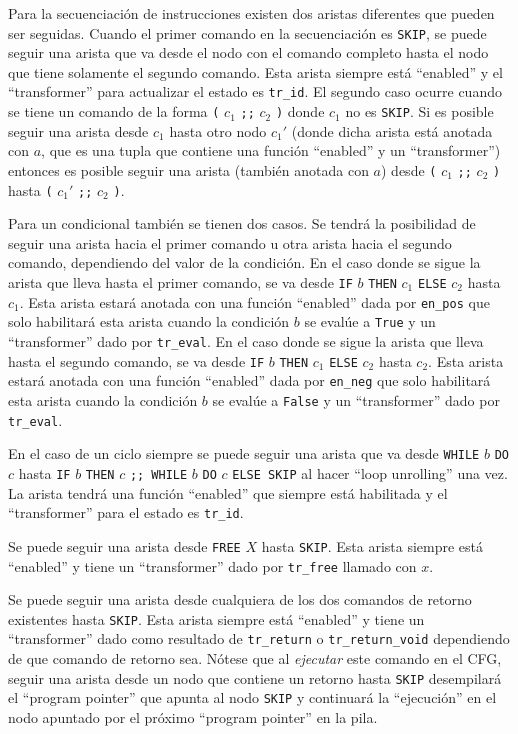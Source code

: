 Para la secuenciación de instrucciones existen dos aristas diferentes que pueden ser seguidas.
Cuando el primer comando en la secuenciación es \verb|SKIP|, se puede seguir una arista que va desde el nodo con el comando completo hasta el nodo que tiene solamente el segundo comando.
Esta arista siempre está ``enabled'' y el ``transformer'' para actualizar el estado es \verb|tr_id|.
El segundo caso ocurre cuando se tiene un comando de la forma \verb|(| $c_{1}$ \verb|;;| $c_{2}$ \verb|)| donde $c_{1}$ no es \verb|SKIP|.
Si es posible seguir una arista desde $c_{1}$ hasta otro nodo $c_{1}'$ (donde dicha arista está anotada con $a$, que es una tupla que contiene una función ``enabled'' y un ``transformer'') entonces es posible seguir una arista (también anotada con $a$) desde \verb|(| $c_{1}$ \verb|;;| $c_{2}$ \verb|)| hasta \verb|(| $c_{1}'$ \verb|;;| $c_{2}$ \verb|)|.

Para un condicional también se tienen dos casos.
Se tendrá la posibilidad de seguir una arista hacia el primer comando u otra arista hacia el segundo comando, dependiendo del valor de la condición.
En el caso donde se sigue la arista que lleva hasta el primer comando, se va desde \verb|IF| $b$ \verb|THEN| $c_{1}$ \verb|ELSE| $c_{2}$ hasta $c_{1}$.
Esta arista estará anotada con una función ``enabled'' dada por \verb|en_pos| que solo habilitará esta arista cuando la condición $b$ se evalúe a \verb|True| y un ``transformer'' dado por \verb|tr_eval|.
En el caso donde se sigue la arista que lleva hasta el segundo comando, se va desde \verb|IF| $b$ \verb|THEN| $c_{1}$ \verb|ELSE| $c_{2}$ hasta $c_{2}$.
Esta arista estará anotada con una función ``enabled'' dada por \verb|en_neg| que solo habilitará esta arista cuando la condición $b$ se evalúe a \verb|False| y un ``transformer'' dado por \verb|tr_eval|.

En el caso de un ciclo siempre se puede seguir una arista que va desde \verb|WHILE| $b$ \verb|DO| $c$ hasta \verb|IF| $b$ \verb|THEN| $c$ \verb|;; WHILE| $b$ \verb|DO| $c$ \verb|ELSE SKIP| al hacer ``loop unrolling'' una vez.
La arista tendrá una función ``enabled'' que siempre está habilitada y el ``transformer'' para el estado es \verb|tr_id|.

Se puede seguir una arista desde \verb|FREE| $X$ hasta \verb|SKIP|.
Esta arista siempre está ``enabled'' y tiene un ``transformer'' dado por \verb|tr_free| llamado con $x$.

Se puede seguir una arista desde cualquiera de los dos comandos de retorno existentes hasta \verb|SKIP|.
Esta arista siempre está ``enabled'' y tiene un ``transformer'' dado como resultado de \verb|tr_return| o \verb|tr_return_void| dependiendo de que comando de retorno sea.
Nótese que al \textit{ejecutar} este comando en el CFG, seguir una arista desde un nodo que contiene un retorno hasta \verb|SKIP| desempilará el ``program pointer'' que apunta al nodo \verb|SKIP| y continuará la ``ejecución'' en el nodo apuntado por el próximo ``program pointer'' en la pila.

